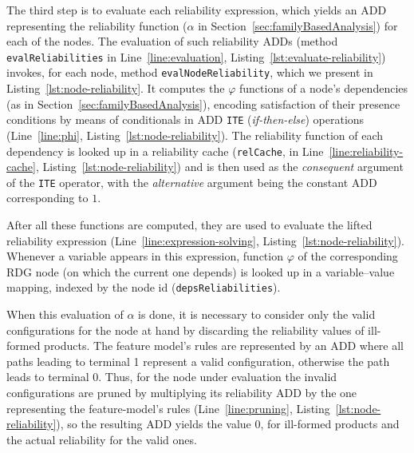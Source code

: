 The third step is to evaluate each reliability expression, which yields an ADD
representing the reliability function ($\alpha$ in
Section~\ref{sec:familyBasedAnalysis}) for each of the nodes. The evaluation
of such reliability ADDs (method \texttt{evalReliabilities} in
Line~\ref{line:evaluation}, Listing~\ref{lst:evaluate-reliability}) invokes, for
each node, method \texttt{evalNodeReliability}, which we present in
Listing~\ref{lst:node-reliability}. It computes the $\varphi$ functions of a
node's dependencies (as in Section~\ref{sec:familyBasedAnalysis}), encoding
satisfaction of their presence conditions by means of conditionals in ADD
\texttt{ITE} (\emph{if-then-else}) operations (Line~\ref{line:phi},
Listing~\ref{lst:node-reliability}). The reliability function of each dependency
is looked up in a reliability cache (\texttt{relCache}, in
Line~\ref{line:reliability-cache}, Listing~\ref{lst:node-reliability}) and is
then used as the \emph{consequent} argument of the \texttt{ITE} operator, with
the \emph{alternative} argument being the constant ADD corresponding to $1$.
 
After all these functions are computed, they are used to evaluate the lifted
reliability expression (Line~\ref{line:expression-solving},
Listing~\ref{lst:node-reliability}). Whenever a variable appears in this
expression, function $\varphi$ of the corresponding RDG node (on which the
current one depends) is looked up in a variable--value mapping, indexed by the
node id (\texttt{depsReliabilities}).

When this evaluation of $\alpha$ is done, it is necessary to consider only the
valid configurations for the node at hand by discarding the reliability values
of ill-formed products.  The feature model's rules are represented by an ADD
where all paths leading to terminal 1 represent a valid configuration, otherwise
the path leads to terminal 0. Thus, for the node under evaluation the invalid
configurations are pruned by multiplying its reliability ADD by the one
representing the feature-model's rules (Line~\ref{line:pruning},
Listing~\ref{lst:node-reliability}), so the resulting ADD yields the value 0,
for ill-formed products and the actual reliability for the valid ones.


